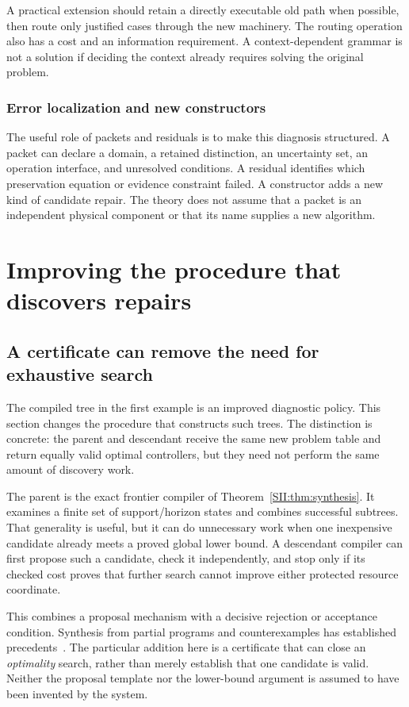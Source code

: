 A practical extension should retain a directly executable old path when possible, then route only justified cases through the new machinery. The routing operation also has a cost and an information requirement. A context-dependent grammar is not a solution if deciding the context already requires solving the original problem.

\subsection{Error localization and new constructors}
The useful role of packets and residuals is to make this diagnosis structured. A packet can declare a domain, a retained distinction, an uncertainty set, an operation interface, and unresolved conditions. A residual identifies which preservation equation or evidence constraint failed. A constructor adds a new kind of candidate repair. The theory does not assume that a packet is an independent physical component or that its name supplies a new algorithm.


\chapter{Improving the procedure that discovers repairs}\label{SII:book:chapter-61}
\label{SII:part:discovery}
\section{A certificate can remove the need for exhaustive search}\label{SII:sec:compiler-change}
The compiled tree in the first example is an improved diagnostic policy. This section changes the procedure that constructs such trees. The distinction is concrete: the parent and descendant receive the same new problem table and return equally valid optimal controllers, but they need not perform the same amount of discovery work.

The parent is the exact frontier compiler of Theorem~\ref{SII:thm:synthesis}. It examines a finite set of support/horizon states and combines successful subtrees. That generality is useful, but it can do unnecessary work when one inexpensive candidate already meets a proved global lower bound. A descendant compiler can first propose such a candidate, check it independently, and stop only if its checked cost proves that further search cannot improve either protected resource coordinate.

This combines a proposal mechanism with a decisive rejection or acceptance condition. Synthesis from partial programs and counterexamples has established precedents~\cite{SII:sketch}. The particular addition here is a certificate that can close an \emph{optimality} search, rather than merely establish that one candidate is valid. Neither the proposal template nor the lower-bound argument is assumed to have been invented by the system.

